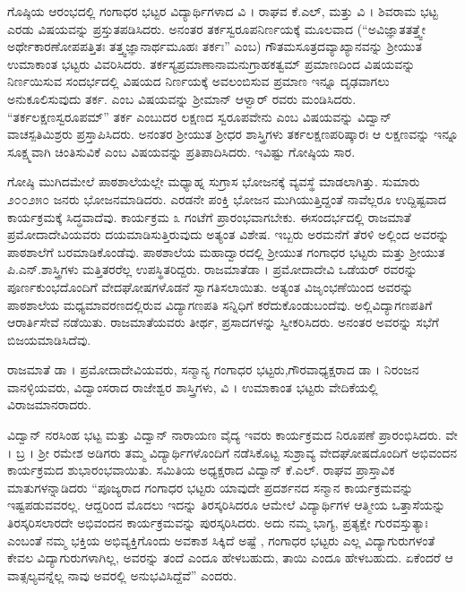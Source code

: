 {ಗೊಷ್ಠಿಯ ಆರಂಭದಲ್ಲಿ ಗಂಗಾಧರ ಭಟ್ಟರ ವಿದ್ಯಾರ್ಥಿಗಳಾದ ವಿ । ರಾಘವ ಕೆ.ಎಲ್, ಮತ್ತು ವಿ । ಶಿವರಾಮ ಭಟ್ಟ ಎರಡು ವಿಷಯವನ್ನು \-ಪ್ರಸ್ತುತಪಡಿಸಿದರು. ಅನಂತರ ತರ್ಕಸ್ವರೂಪನಿರ್ಣಯಕ್ಕೆ  ಮೂಲವಾದ (“ಅವಿಜ್ಞಾತತತ್ತ್ವೇ ಅರ್ಥೇ\break ಕಾರಣೋಪಪತ್ತಿತಃ ತತ್ತ್ವಜ್ಞಾನಾರ್ಥಮೂಹಃ ತರ್ಕಃ” ಎಂಬ) ಗೌತಮಸೂತ್ರದ\break ವ್ಯಾಖ್ಯಾನವನ್ನು ಶ್ರೀಯುತ ಉಮಾಕಾಂತ ಭಟ್ಟರು ವಿವರಿಸಿದರು. ತರ್ಕಸ್ಯ\break ಪ್ರಮಾಣಾನಾಮನುಗ್ರಾಹಕತ್ವಮ್ \enginline{-} ಪ್ರಮಾಣದಿಂದ ವಿಷಯವನ್ನು ನಿರ್ಣಯಿಸುವ ಸಂದರ್ಭದಲ್ಲಿ ವಿಷಯದ  ನಿರ್ಣಯಕ್ಕೆ ಅವಲಂಬಿಸುವ ಪ್ರಮಾಣ ಇನ್ನೂ ದೃಢ\-ವಾಗಲು ಅನುಕೂಲಿಸುವುದು ತರ್ಕ. ಎಂಬ ವಿಷಯವನ್ನು ಶ್ರೀಮಾನ್ ಆಳ್ವಾರ್ ರವರು ಮಂಡಿಸಿದರು. “ತರ್ಕಲಕ್ಷಣಸ್ವರೂಪಮ್” \enginline{-} ತರ್ಕ ಎಂಬುದರ ಲಕ್ಷಣದ ಸ್ವರೂಪವೇನು ಎಂಬ ವಿಷಯವನ್ನು ವಿದ್ವಾನ್ ವಾಚಸ್ಪತಿಮಿಶ್ರರು ಪ್ರಸ್ತಾಪಿಸಿದರು. ಅನಂತರ ಶ್ರೀಯುತ ಶ್ರೀಧರ ಶಾಸ್ತ್ರಿಗಳು ತರ್ಕಲಕ್ಷಣಪರಿಷ್ಕಾರಃ ಆ ಲಕ್ಷಣವನ್ನು ಇನ್ನೂ ಸೂಕ್ಷ್ಮವಾಗಿ ಚಿಂತಿಸುವಿಕೆ ಎಂಬ ವಿಷಯವನ್ನು ಪ್ರತಿಪಾದಿಸಿದರು. ಇವಿಷ್ಟು ಗೋಷ್ಠಿಯ ಸಾರ.

ಗೋಷ್ಠಿ ಮುಗಿದಮೇಲೆ ಪಾಠಶಾಲೆಯಲ್ಲೇ ಮಧ್ಯಾಹ್ನ ಸುಗ್ರಾಸ ಭೋಜನಕ್ಕೆ ವ್ಯವಸ್ಥೆ ಮಾಡಲಾಗಿತ್ತು. ಸುಮಾರು ೨೦೦\enginline{-}೨೫೦ ಜನರು  ಭೋಜನಮಾಡಿದರು. ಎರಡನೇ ಪಂಕ್ತಿ ಭೋಜನ ಮುಗಿಯುತ್ತಿದ್ದಂತೆ ನಾವೆಲ್ಲರೂ ಉದ್ದಿಷ್ಟವಾದ ಕಾರ್ಯ\-ಕ್ರಮಕ್ಕೆ ಸಿದ್ಧವಾದೆವು. ಕಾರ್ಯಕ್ರಮ ೩ ಗಂಟೆಗೆ ಪ್ರಾರಂಭವಾಗಬೇಕು. ಈ\break ಸಂದರ್ಭದಲ್ಲಿ ರಾಜಮಾತೆ ಪ್ರಮೋದಾದೇವಿಯವರು ದಯಮಾಡಿಸುತ್ತಿರುವುದು ಅತ್ಯಂತ ವಿಶೇಷ. ಇಬ್ಬರು ಅರಮನೆಗೆ ತೆರಳಿ ಅಲ್ಲಿಂದ  ಅವರನ್ನು ಪಾಠಶಾಲೆಗೆ ಬರ\-ಮಾಡಿ\-ಕೊಂಡೆವು. ಪಾಠಶಾಲೆಯ ಮಹಾದ್ವಾರದಲ್ಲಿ ಶ್ರೀಯುತ ಗಂಗಾಧರ ಭಟ್ಟರು ಮತ್ತು ಶ್ರೀಯುತ ಪಿ.ಎನ್.ಶಾಸ್ತ್ರಿಗಳು ಮತ್ತಿತರರೆಲ್ಲ ಉಪಸ್ಥಿತರಿದ್ದರು. ರಾಜಮಾತೆ\break ಡಾ । ಪ್ರಮೋದಾದೇವಿ ಒಡೆಯರ್ ರವರನ್ನು ಪೂರ್ಣಕುಂಭದೊಂದಿಗೆ ವೇದಘೋಷಗಳೊಡನೆ ಸ್ವಾಗತಿಸಲಾಯಿತು. ಅತ್ಯಂತ ವಿಜೃಂಭಣೆಯಿಂದ ಅವರನ್ನು ಪಾಠಶಾಲೆಯ ಮಧ್ಯಮಾವರಣದಲ್ಲಿರುವ ವಿದ್ಯಾಗಣಪತಿ ಸನ್ನಿಧಿಗೆ ಕರೆದುಕೊಂಡುಬಂದೆವು. ಅಲ್ಲಿ\break ವಿದ್ಯಾಗಣಪತಿಗೆ ಆರಾರ್ತಿಸೇವೆ ನಡೆಯಿತು. ರಾಜಮಾತೆಯವರು ತೀರ್ಥ, ಪ್ರಸಾದಗಳನ್ನು ಸ್ವೀಕರಿಸಿದರು. ಅನಂತರ ಅವರನ್ನು ಸಭೆಗೆ ಬಿಜಯಮಾಡಿಸಿದೆವು. 

ರಾಜಮಾತೆ ಡಾ । ಪ್ರಮೋದಾದೇವಿಯವರು, ಸನ್ಮಾನ್ಯ ಗಂಗಾಧರ ಭಟ್ಟರು,\break ಗೌರವಾಧ್ಯಕ್ಷರಾದ ಡಾ । ನಿರಂಜನ ವಾನಳ್ಳಿಯವರು, ವಿದ್ವಾಂಸರಾದ ರಾಜೇಶ್ವರ ಶಾಸ್ತ್ರಿಗಳು, ವಿ । ಉಮಾಕಾಂತ ಭಟ್ಟರು ವೇದಿಕೆಯಲ್ಲಿ ವಿರಾಜಮಾನರಾದರು.

ವಿದ್ವಾನ್ ನರಸಿಂಹ ಭಟ್ಟ ಮತ್ತು ವಿದ್ವಾನ್ ನಾರಾಯಣ ವೈದ್ಯ ಇವರು ಕಾರ್ಯ\-ಕ್ರಮದ ನಿರೂಪಣೆ ಪ್ರಾರಂಭಿಸಿದರು. ವೇ । ಬ್ರ । ಶ್ರೀ ರಮೇಶ ಅಡಿಗರು ತಮ್ಮ ವಿದ್ಯಾರ್ಥಿಗಳೊಂದಿಗೆ ನಡೆಸಿಕೊಟ್ಟ ಸುಶ್ರಾವ್ಯ ವೇದಘೋಷದೊಂದಿಗೆ ಅಭಿವಂದನ ಕಾರ್ಯಕ್ರಮದ ಶುಭಾರಂಭವಾಯಿತು. ಸಮಿತಿಯ ಅಧ್ಯಕ್ಷರಾದ ವಿದ್ವಾನ್ ಕೆ.ಎಲ್. ರಾಘವ ಪ್ರಾಸ್ತಾವಿಕ ಮಾತುಗಳನ್ನಾಡಿದರು \enginline{-} “ಪೂಜ್ಯರಾದ ಗಂಗಾಧರ ಭಟ್ಟರು ಯಾವುದೇ ಪ್ರದರ್ಶನದ ಸನ್ಮಾನ ಕಾರ್ಯಕ್ರಮವನ್ನು ಇಷ್ಟ\-ಪಡುವವರಲ್ಲ. ಆದ್ದರಿಂದ ಮೊದಲು ಇದನ್ನು ತಿರಸ್ಕರಿಸಿದರೂ ಆಮೇಲೆ ವಿದ್ಯಾರ್ಥಿಗಳ ಆತ್ಮೀಯ ಒತ್ತಾಸೆಯನ್ನು ತಿರಸ್ಕರಿಸಲಾರದೇ ಅಭಿವಂದನ ಕಾರ್ಯಕ್ರಮವನ್ನು ಪುರಸ್ಕರಿಸಿದರು. ಅದು ನಮ್ಮ ಭಾಗ್ಯ, ಪ್ರತ್ಯಕ್ಷೇ ಗುರವಸ್ತುತ್ಯಾಃ ಎಂಬಂತೆ ನಮ್ಮ ಭಕ್ತಿಯ ಅಭಿವ್ಯಕ್ತಿಗೊಂದು ಅವಕಾಶ  ಸಿಕ್ಕಿದೆ ಅಷ್ಟೆ , ಗಂಗಾಧರ ಭಟ್ಟರು ಎಲ್ಲ ವಿದ್ಯಾಗುರು\-ಗಳಂತೆ ಕೇವಲ ವಿದ್ಯಾಗುರುಗಳಾಗಿಲ್ಲ, ಅವರನ್ನು ತಂದೆ ಎಂದೂ ಹೇಳಬಹುದು, ತಾಯಿ ಎಂದೂ ಹೇಳಬಹುದು. ಏಕೆಂದರೆ ಆ ವಾತ್ಸಲ್ಯವನ್ನೆಲ್ಲ ನಾವು ಅವರಲ್ಲಿ ಅನುಭವಿ\-ಸಿದ್ದೆವೆ” ಎಂದರು. 

}

